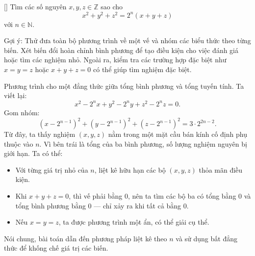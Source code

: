 \documentclass[../04-diophantine-equations.tex]{subfiles}
\begin{document}
\begin{exercise*}\label{example:ROU-2014-MO-G9-P1}[\textbf{}]
    Tìm các số nguyên \( x, y, z \in \mathbb{Z} \) sao cho
    \[
        x^2 + y^2 + z^2 = 2^n(x + y + z)
    \]
    với \( n \in \mathbb{N} \).
\end{exercise*}

\begin{remark*}
    Gợi ý: Thử đưa toàn bộ phương trình về một vế và nhóm các biểu thức theo từng biến.
    Xét biến đổi hoàn chỉnh bình phương để tạo điều kiện cho việc đánh giá hoặc tìm các nghiệm nhỏ.
    Ngoài ra, kiểm tra các trường hợp đặc biệt như \( x = y = z \) hoặc \( x + y + z = 0 \) có thể giúp tìm nghiệm đặc biệt.
\end{remark*}

\begin{story*}
    Phương trình cho một đẳng thức giữa tổng bình phương và tổng tuyến tính. Ta viết lại:
    \[
        x^2 - 2^n x + y^2 - 2^n y + z^2 - 2^n z = 0.
    \]
    Gom nhóm:
    \[
        (x - 2^{n-1})^2 + (y - 2^{n-1})^2 + (z - 2^{n-1})^2 = 3 \cdot 2^{2n - 2}.
    \]
    Từ đây, ta thấy nghiệm \( (x, y, z) \) nằm trong một mặt cầu bán kính cố định phụ thuộc vào \( n \).  
    Vì bên trái là tổng của ba bình phương, số lượng nghiệm nguyên bị giới hạn. Ta có thể:
    \begin{itemize}[topsep=0pt, partopsep=0pt, itemsep=0pt]
        \item Với từng giá trị nhỏ của \( n \), liệt kê hữu hạn các bộ \( (x, y, z) \) thỏa mãn điều kiện.
        \item Khi \( x + y + z = 0 \), thì vế phải bằng 0, nên ta tìm các bộ ba có tổng bằng 0 và tổng bình phương bằng 0 — chỉ xảy ra khi tất cả bằng 0.
        \item Nếu \( x = y = z \), ta được phương trình một ẩn, có thể giải cụ thể.
    \end{itemize}
    Nói chung, bài toán dẫn đến phương pháp liệt kê theo \( n \) và sử dụng bất đẳng thức để khống chế giá trị các biến.
\end{story*}
\end{document}
